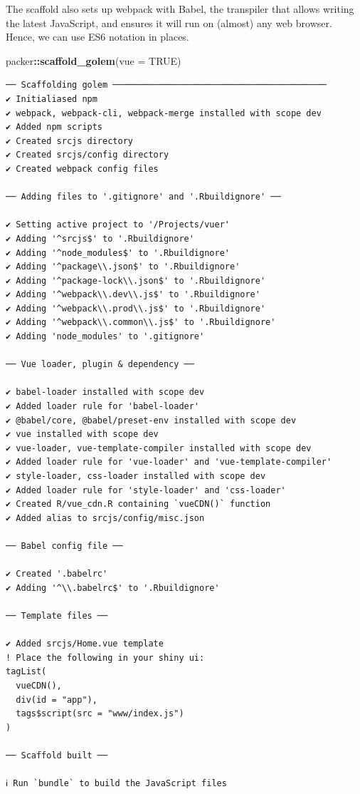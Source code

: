 \documentclass[10pt,]{krantz}
\makeatletter
\newenvironment{Shaded}{\begin{snugshade}}{\end{snugshade}}
\newcommand{\DataTypeTok}[1]{\textcolor[rgb]{0.27,0.27,0.27}{#1}}
\newcommand{\KeywordTok}[1]{\textcolor[rgb]{0.27,0.27,0.27}{\textbf{#1}}}
\newcommand{\NormalTok}[1]{#1}
\newcommand{\OperatorTok}[1]{\textcolor[rgb]{0.43,0.43,0.43}{\textbf{#1}}}
\newcommand{\OtherTok}[1]{\textcolor[rgb]{0.37,0.37,0.37}{#1}}
\newenvironment{kframe}{%
\medskip{}
\setlength{\fboxsep}{.8em}
 \def\at@end@of@kframe{}%
 \ifinner\ifhmode%
  \def\at@end@of@kframe{\end{minipage}}%
  \begin{minipage}{\columnwidth}%
 \fi\fi%
 \def\FrameCommand##1{\hskip\@totalleftmargin \hskip-\fboxsep
 \colorbox{shadecolor}{##1}\hskip-\fboxsep
     \hskip-\linewidth \hskip-\@totalleftmargin \hskip\columnwidth}%
 \MakeFramed {\advance\hsize-\width
   \@totalleftmargin\z@ \linewidth\hsize
   \@setminipage}}%
 {\par\unskip\endMakeFramed%
 \at@end@of@kframe}
\renewenvironment{Shaded}{\begin{kframe}}{\end{kframe}}
\makeatother
\begin{document}
The scaffold also sets up webpack with Babel, the transpiler that allows writing the latest JavaScript, and ensures it will run on (almost) any web browser. Hence, we can use ES6 notation in places.

\begin{Shaded}
\begin{Highlighting}[]
\NormalTok{packer}\OperatorTok{::}\KeywordTok{scaffold_golem}\NormalTok{(}\DataTypeTok{vue =} \OtherTok{TRUE}\NormalTok{)}
\end{Highlighting}
\end{Shaded}

\begin{verbatim}
── Scaffolding golem ──────────────────────────────────────────
✔ Initialiased npm
✔ webpack, webpack-cli, webpack-merge installed with scope dev
✔ Added npm scripts
✔ Created srcjs directory
✔ Created srcjs/config directory
✔ Created webpack config files

── Adding files to '.gitignore' and '.Rbuildignore' ──

✔ Setting active project to '/Projects/vuer'
✔ Adding '^srcjs$' to '.Rbuildignore'
✔ Adding '^node_modules$' to '.Rbuildignore'
✔ Adding '^package\\.json$' to '.Rbuildignore'
✔ Adding '^package-lock\\.json$' to '.Rbuildignore'
✔ Adding '^webpack\\.dev\\.js$' to '.Rbuildignore'
✔ Adding '^webpack\\.prod\\.js$' to '.Rbuildignore'
✔ Adding '^webpack\\.common\\.js$' to '.Rbuildignore'
✔ Adding 'node_modules' to '.gitignore'

── Vue loader, plugin & dependency ──

✔ babel-loader installed with scope dev
✔ Added loader rule for 'babel-loader'
✔ @babel/core, @babel/preset-env installed with scope dev
✔ vue installed with scope dev
✔ vue-loader, vue-template-compiler installed with scope dev
✔ Added loader rule for 'vue-loader' and 'vue-template-compiler'
✔ style-loader, css-loader installed with scope dev
✔ Added loader rule for 'style-loader' and 'css-loader'
✔ Created R/vue_cdn.R containing `vueCDN()` function
✔ Added alias to srcjs/config/misc.json

── Babel config file ──

✔ Created '.babelrc'
✔ Adding '^\\.babelrc$' to '.Rbuildignore'

── Template files ──

✔ Added srcjs/Home.vue template
! Place the following in your shiny ui:
tagList(
  vueCDN(),
  div(id = "app"),
  tags$script(src = "www/index.js")
)

── Scaffold built ──

ℹ Run `bundle` to build the JavaScript files
\end{verbatim}
\end{document}
